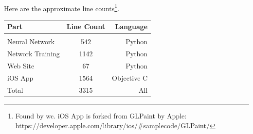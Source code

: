 \documentclass{article}
\begin{document}
    \paragraph{}Here are the approximate line 
    counts\footnote{Found by wc. iOS App is forked from GLPaint by Apple: 
    https://developer.apple.com/library/ios/\#samplecode/GLPaint/}. \\

    \begin{tabular}{ l c r }
        Part & Line Count & Language \\
        \hline \\
        Neural Network & 542 & Python \\
        Network Training & 1142 & Python \\
        Web Site & 67 & Python \\
        iOS App & 1564 & Objective C \\
        Total & 3315 & All \\
    \end{tabular}
\end{document}

